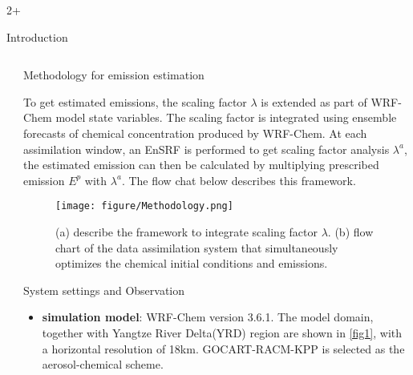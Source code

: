 \documentclass[final]{beamer}
\newlength{\sepwidth}
\newlength{\colwidth}
\newcommand{\separatorcolumn}{\begin{column}{\sepwidth}\end{column}}
\begin{document}
\begin{frame}[t]
\begin{columns}
\begin{column}{2\colwidth+\sepwidth}
\begin{block}{Introduction}
    		
    	\end{block}
    	\end{column}

	\end{columns}

	\begin{columns}[t]
		\separatorcolumn
		
		\begin{column}{\colwidth}
			
			\begin{block}{Methodology for emission estimation}
				
                To get estimated emissions, the scaling factor $\lambda$ is extended as part of WRF-Chem model state variables. The scaling factor is integrated using ensemble forecasts of chemical concentration produced by WRF-Chem. At each assimilation window, an EnSRF is performed to get scaling factor analysis $\lambda^a$, the estimated emission can then be calculated by multiplying prescribed emission $E^p$ with $\lambda^a$. The flow chat below describes this framework.  
 
                \begin{figure}
                    \centerline{\texttt{[image: figure/Methodology.png]}}
                    \caption{(a) describe the framework to integrate scaling factor $\lambda$. (b) flow chart of the data assimilation system that simultaneously optimizes the chemical initial
                    conditions and emissions.}\label{fig2}
                \end{figure}

				
			
				
			\end{block}

            \begin{block}{System settings and Observation}
                \begin{itemize}
					\item \textbf{simulation model}: WRF-Chem version 3.6.1. The model domain, together with Yangtze River Delta(YRD) region are shown in \cref{fig1},  with a horizontal resolution of 18km. GOCART-RACM-KPP is selected as the aerosol-chemical scheme. 


\end{itemize}
\end{block}
\end{column}
\end{columns}
\end{frame}
\end{document}
